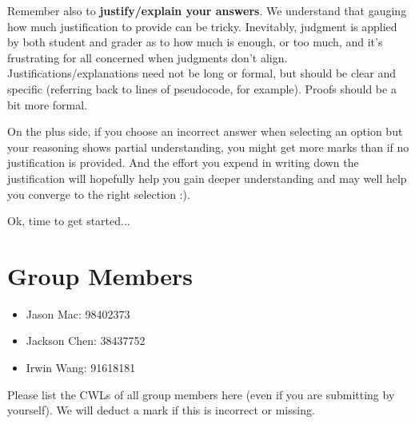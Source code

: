 \documentclass[11pt,fleqn]{exam}
\begin{document}
Remember also  to \textbf{justify/explain  your answers}. We  understand that  gauging how
much  justification to  provide can  be tricky.  Inevitably, judgment  is applied  by both
student and  grader as to how  much is enough, or  too much, and it's  frustrating for all
concerned  when judgments  don't align.  Justifications/explanations need  not be  long or
formal, but  should be  clear and  specific (referring  back to  lines of  pseudocode, for
example). Proofs should be a bit more formal.

On the  plus side, if  you choose an  incorrect answer when  selecting an option  but your
reasoning shows partial  understanding, you might get more marks  than if no justification
is provided. And  the effort you expend  in writing down the  justification will hopefully
help you gain deeper  understanding and may well help you converge  to the right selection
:).

\vspace{.1in}

Ok, time to get started...

\clearpage

\section*{Group Members}
\begin{itemize}
	\item Jason Mac: 98402373
	\item Jackson Chen: 38437752
	\item Irwin Wang: 91618181
\end{itemize}

Please list the CWLs of all group members here (even if you are submitting by yourself). We will deduct a mark if this is incorrect or missing.




\end{document}
